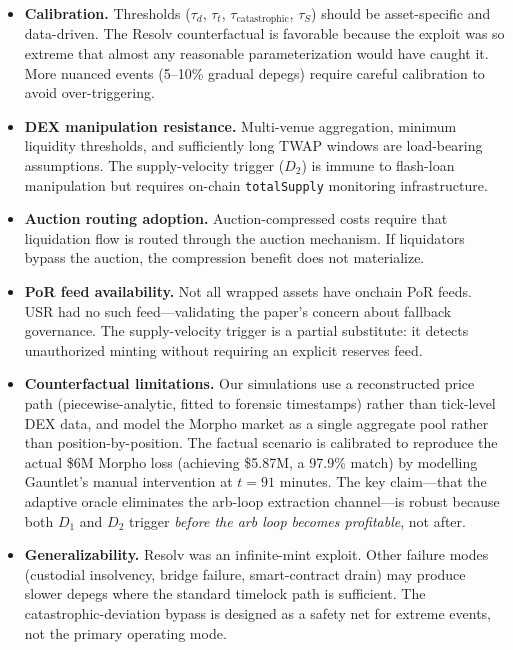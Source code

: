 \documentclass[11pt]{article}
\begin{document}
\begin{itemize}[leftmargin=*]
\item \textbf{Calibration.} Thresholds ($\tau_d$, $\tau_t$, $\tau_{\mathrm{catastrophic}}$, $\tau_S$) should be asset-specific and data-driven. The Resolv counterfactual is favorable because the exploit was so extreme that almost any reasonable parameterization would have caught it. More nuanced events (5--10\% gradual depegs) require careful calibration to avoid over-triggering.

\item \textbf{DEX manipulation resistance.} Multi-venue aggregation, minimum liquidity thresholds, and sufficiently long TWAP windows are load-bearing assumptions. The supply-velocity trigger ($D_2$) is immune to flash-loan manipulation but requires on-chain \texttt{totalSupply} monitoring infrastructure.

\item \textbf{Auction routing adoption.} Auction-compressed costs require that liquidation flow is routed through the auction mechanism. If liquidators bypass the auction, the compression benefit does not materialize.

\item \textbf{PoR feed availability.} Not all wrapped assets have onchain PoR feeds. USR had no such feed---validating the paper's concern about fallback governance. The supply-velocity trigger is a partial substitute: it detects unauthorized minting without requiring an explicit reserves feed.

\item \textbf{Counterfactual limitations.} Our simulations use a reconstructed price path (piecewise-analytic, fitted to forensic timestamps) rather than tick-level DEX data, and model the Morpho market as a single aggregate pool rather than position-by-position. The factual scenario is calibrated to reproduce the actual \$6M Morpho loss (achieving \$5.87M, a 97.9\% match) by modelling Gauntlet's manual intervention at $t=91$ minutes. The key claim---that the adaptive oracle eliminates the arb-loop extraction channel---is robust because both $D_1$ and $D_2$ trigger \emph{before the arb loop becomes profitable}, not after.

\item \textbf{Generalizability.} Resolv was an infinite-mint exploit. Other failure modes (custodial insolvency, bridge failure, smart-contract drain) may produce slower depegs where the standard timelock path is sufficient. The catastrophic-deviation bypass is designed as a safety net for extreme events, not the primary operating mode.
\end{itemize}
\end{document}

